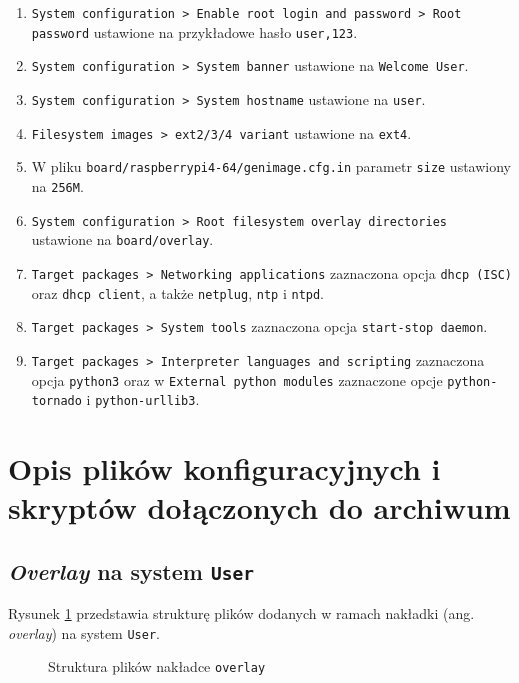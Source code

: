 \documentclass{article}
\begin{document}
\begin{enumerate}[label=\arabic*.]
    \item \texttt{System configuration > Enable root login and password > Root password} ustawione na przykładowe hasło \texttt{user,123}.
    \item \texttt{System configuration > System banner} ustawione na \texttt{Welcome User}.
    \item \texttt{System configuration > System hostname} ustawione na \texttt{user}.
    \item \texttt{Filesystem images > ext2/3/4 variant} ustawione na \texttt{ext4}.
    \item W pliku \texttt{board/raspberrypi4-64/genimage.cfg.in} parametr \texttt{size} ustawiony na \texttt{256M}.
    \item \texttt{System configuration > Root filesystem overlay directories} ustawione na \texttt{board/overlay}.
    \item \texttt{Target packages > Networking applications} zaznaczona opcja \texttt{dhcp (ISC)} oraz \texttt{dhcp client}, a także \texttt{netplug}, \texttt{ntp} i \texttt{ntpd}.
    \item \texttt{Target packages > System tools} zaznaczona opcja \texttt{start-stop daemon}.
    \item \texttt{Target packages > Interpreter languages and scripting} zaznaczona opcja \texttt{python3} oraz w \texttt{External python modules} zaznaczone opcje \texttt{python-tornado} i \texttt{python-urllib3}.
\end{enumerate}

\section{Opis plików konfiguracyjnych i skryptów dołączonych do archiwum}

\subsection{\textit{Overlay} na system \texttt{User}}

Rysunek \ref{fig:tree-overlay} przedstawia strukturę plików dodanych w ramach nakładki (ang. \textit{overlay}) na system \texttt{User}.

\begin{figure}[H]
    \caption{Struktura plików nakładce \texttt{overlay}}
    \label{fig:tree-overlay}
\end{figure}
\end{document}
